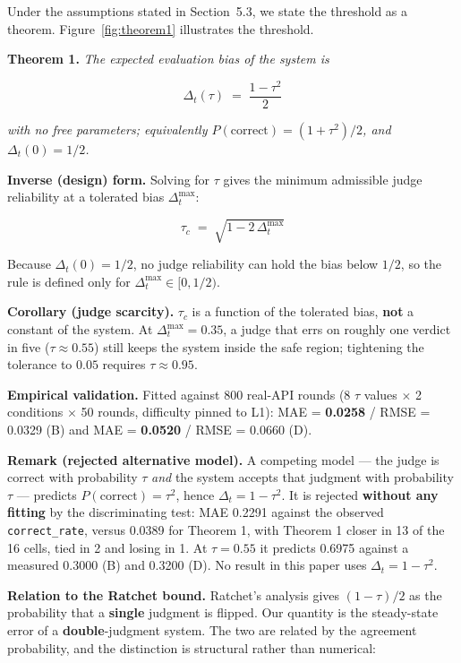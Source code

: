 \documentclass{article}
\begin{document}
Under the assumptions stated in Section~5.3, we state the threshold as a theorem.
Figure~\ref{fig:theorem1} illustrates the threshold.

\textbf{Theorem 1.} \textit{The expected evaluation bias of the system is}

\[
  \Delta_t(\tau) \;=\; \frac{1-\tau^{2}}{2}
\]

\textit{with no free parameters; equivalently $P(\text{correct}) = (1+\tau^{2})/2$, and
$\Delta_t(0) = 1/2$.}

\textbf{Inverse (design) form.} Solving for $\tau$ gives the minimum admissible judge reliability at
a tolerated bias $\Delta_t^{\max}$:

\[
  \tau_c \;=\; \sqrt{1 - 2\,\Delta_t^{\max}}
\]

Because $\Delta_t(0) = 1/2$, no judge reliability can hold the bias below $1/2$, so the rule is
defined only for $\Delta_t^{\max} \in [0, 1/2)$.

\textbf{Corollary (judge scarcity).} $\tau_c$ is a function of the tolerated bias, \textbf{not} a
constant of the system. At $\Delta_t^{\max} = 0.35$, a judge that errs on roughly one verdict in five
($\tau \approx 0.55$) still keeps the system inside the safe region; tightening the tolerance to
$0.05$ requires $\tau \approx 0.95$.

\textbf{Empirical validation.} Fitted against 800 real-API rounds (8 $\tau$ values $\times$ 2
conditions $\times$ 50 rounds, difficulty pinned to L1): MAE = \textbf{0.0258} / RMSE = 0.0329 (B)
and MAE = \textbf{0.0520} / RMSE = 0.0660 (D).

\textbf{Remark (rejected alternative model).} A competing model --- the judge is correct with
probability $\tau$ \textit{and} the system accepts that judgment with probability $\tau$ --- predicts
$P(\text{correct}) = \tau^{2}$, hence $\Delta_t = 1-\tau^{2}$. It is rejected \textbf{without any
fitting} by the discriminating test: MAE 0.2291 against the observed \texttt{correct\_rate}, versus
0.0389 for Theorem 1, with Theorem 1 closer in 13 of the 16 cells, tied in 2 and losing in 1. At
$\tau = 0.55$ it predicts 0.6975 against a measured 0.3000 (B) and 0.3200 (D). No result in this
paper uses $\Delta_t = 1-\tau^{2}$.

\textbf{Relation to the Ratchet bound.} Ratchet's analysis gives $(1 - \tau)/2$ as the probability
that a \textbf{single} judgment is flipped. Our quantity is the steady-state error of a
\textbf{double}-judgment system. The two are related by the agreement probability, and the
distinction is structural rather than numerical:
\end{document}
